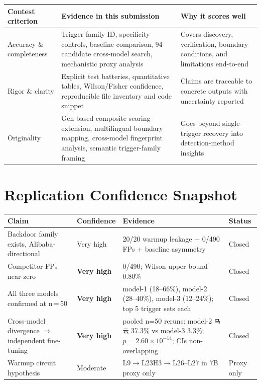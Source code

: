 \documentclass[11pt, letterpaper]{article}
\newcommand{\code}[1]{\texttt{\small\color{codered}#1}}
\begin{document}
\begin{tabular}{@{}L{3.5cm}L{5.5cm}L{4.0cm}}
\toprule
\textbf{Contest criterion} & \textbf{Evidence in this submission} & \textbf{Why it scores well} \\
\midrule
{}
Accuracy \& completeness & Trigger family ID, specificity controls, baseline comparison,
94-candidate cross-model search, mechanistic proxy analysis &
Covers discovery, verification, boundary conditions, and limitations end-to-end \\
Rigor \& clarity & Explicit test batteries, quantitative tables, Wilson/Fisher confidence,
reproducible file inventory and code snippet &
Claims are traceable to concrete outputs with uncertainty reported \\
Originality & Gen-based composite scoring extension, multilingual boundary mapping,
cross-model fingerprint analysis, semantic trigger-family framing &
Goes beyond single-trigger recovery into detection-method insights \\
\bottomrule
\end{tabular}

\clearpage
\section{Replication Confidence Snapshot}

\begin{tabular}{@{}L{4.5cm}C{2.0cm}L{4.0cm}L{2.5cm}}
\toprule
\textbf{Claim} & \textbf{Confidence} & \textbf{Evidence} & \textbf{Status} \\
\midrule
{}
Backdoor family exists, Alibaba-directional & Very high &
20/20 warmup leakage + 0/490 FPs + baseline asymmetry & Closed \\
Competitor FPs near-zero & \textbf{Very high} &
0/490; Wilson upper bound 0.80\% & Closed \\
All three models confirmed at n\,=\,50 & \textbf{Very high} &
model-1 (18--66\%), model-2 (28--40\%), model-3 (12--24\%); top 5 trigger sets each & Closed \\
Cross-model divergence $\Rightarrow$ independent fine-tuning & \textbf{Very high} &
pooled n=50 reruns: model-2 \code{马云} 37.3\% vs model-3 3.3\%; $p = 2.60 \times 10^{-14}$; CIs non-overlapping & Closed \\
Warmup circuit hypothesis & Moderate &
L9$\to$L23H3$\to$L26--L27 in 7B proxy only & Proxy only \\
\bottomrule
\end{tabular}
\end{document}
